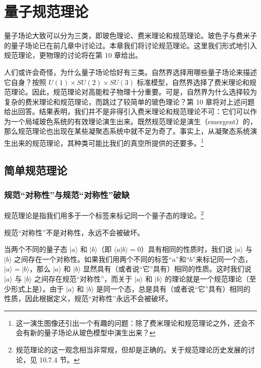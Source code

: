 
\chapter{量子规范理论}

量子场论大致可以分为三类，即玻色理论、费米理论和规范理论。玻色子与费米子的量子场论已在前几章中讨论过。本章我们将讨论规范理论。这里我们形式地引入规范理论，更物理的讨论将在第 10 章给出。

人们或许会奇怪，为什么量子场论恰好有三类。自然界选择用哪些量子场论来描述它自身？按照 $U(1)\times SU(2)\times SU(3)$ 标准模型，自然界选择了费米理论和规范理论。因此，规范理论对高能粒子物理十分重要。可是，自然界为什么选择较为复杂的费米理论和规范理论，而跳过了较简单的玻色理论？第 10 章将对上述问题给出回答。结果表明，我们并不是非得引入费米理论和规范理论不可：它们可以作为一个局域玻色系统的有效理论演生出来。既然规范理论是演生（emergent）的，那么规范理论也出现在某些凝聚态系统中就不足为奇了。事实上，从凝聚态系统演生出来的规范理论，其种类可能比我们的真空所提供的还要多。\footnote{这一演生图像还引出一个有趣的问题：除了费米理论和规范理论之外，还会不会有新的量子场论从玻色模型中演生出来？}

\section{简单规范理论}

\subsection{规范“对称性”与规范“对称性”破缺}

\begin{keypoints}
\item 规范理论是指我们用多于一个标签来标记同一个量子态的理论。\footnote{规范理论的这一观念相当非常规，但却是正确的。关于规范理论历史发展的讨论，见 10.7.4 节。}
\item 规范“对称性”不是对称性，永远不会被破坏。
\end{keypoints}

当两个不同的量子态 $|a\rangle$ 和 $|b\rangle$（即 $\langle a|b\rangle = 0$）具有相同的性质时，我们说 $|a\rangle$ 与 $|b\rangle$ 之间存在一个对称性。如果我们用两个不同的标签“$a$”和“$b$”来标记同一个态，$|a\rangle = |b\rangle$，那么 $|a\rangle$ 和 $|b\rangle$ 显然具有（或者说“它”具有）相同的性质。这时我们说 $|a\rangle$ 与 $|b\rangle$ 之间存在规范“对称性”，而关于 $|a\rangle$ 和 $|b\rangle$ 的理论就是一个规范理论（至少形式上是）。由于 $|a\rangle$ 和 $|b\rangle$ 是同一个态，总是具有（或者说“它”具有）相同的性质，因此根据定义，规范“对称性”永远不会被破坏。

